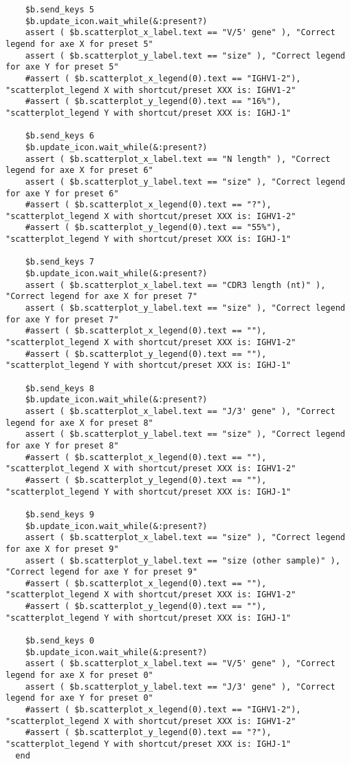 \begin{verbatim}
    $b.send_keys 5
    $b.update_icon.wait_while(&:present?)
    assert ( $b.scatterplot_x_label.text == "V/5' gene" ), "Correct legend for axe X for preset 5"
    assert ( $b.scatterplot_y_label.text == "size" ), "Correct legend for axe Y for preset 5"
    #assert ( $b.scatterplot_x_legend(0).text == "IGHV1-2"), "scatterplot_legend X with shortcut/preset XXX is: IGHV1-2"
    #assert ( $b.scatterplot_y_legend(0).text == "16%"), "scatterplot_legend Y with shortcut/preset XXX is: IGHJ-1"

    $b.send_keys 6
    $b.update_icon.wait_while(&:present?)
    assert ( $b.scatterplot_x_label.text == "N length" ), "Correct legend for axe X for preset 6"
    assert ( $b.scatterplot_y_label.text == "size" ), "Correct legend for axe Y for preset 6"
    #assert ( $b.scatterplot_x_legend(0).text == "?"), "scatterplot_legend X with shortcut/preset XXX is: IGHV1-2"
    #assert ( $b.scatterplot_y_legend(0).text == "55%"), "scatterplot_legend Y with shortcut/preset XXX is: IGHJ-1"

    $b.send_keys 7
    $b.update_icon.wait_while(&:present?)
    assert ( $b.scatterplot_x_label.text == "CDR3 length (nt)" ), "Correct legend for axe X for preset 7"
    assert ( $b.scatterplot_y_label.text == "size" ), "Correct legend for axe Y for preset 7"
    #assert ( $b.scatterplot_x_legend(0).text == ""), "scatterplot_legend X with shortcut/preset XXX is: IGHV1-2"
    #assert ( $b.scatterplot_y_legend(0).text == ""), "scatterplot_legend Y with shortcut/preset XXX is: IGHJ-1"

    $b.send_keys 8
    $b.update_icon.wait_while(&:present?)
    assert ( $b.scatterplot_x_label.text == "J/3' gene" ), "Correct legend for axe X for preset 8"
    assert ( $b.scatterplot_y_label.text == "size" ), "Correct legend for axe Y for preset 8"
    #assert ( $b.scatterplot_x_legend(0).text == ""), "scatterplot_legend X with shortcut/preset XXX is: IGHV1-2"
    #assert ( $b.scatterplot_y_legend(0).text == ""), "scatterplot_legend Y with shortcut/preset XXX is: IGHJ-1"

    $b.send_keys 9
    $b.update_icon.wait_while(&:present?)
    assert ( $b.scatterplot_x_label.text == "size" ), "Correct legend for axe X for preset 9"
    assert ( $b.scatterplot_y_label.text == "size (other sample)" ), "Correct legend for axe Y for preset 9"
    #assert ( $b.scatterplot_x_legend(0).text == ""), "scatterplot_legend X with shortcut/preset XXX is: IGHV1-2"
    #assert ( $b.scatterplot_y_legend(0).text == ""), "scatterplot_legend Y with shortcut/preset XXX is: IGHJ-1"

    $b.send_keys 0
    $b.update_icon.wait_while(&:present?)
    assert ( $b.scatterplot_x_label.text == "V/5' gene" ), "Correct legend for axe X for preset 0"
    assert ( $b.scatterplot_y_label.text == "J/3' gene" ), "Correct legend for axe Y for preset 0"
    #assert ( $b.scatterplot_x_legend(0).text == "IGHV1-2"), "scatterplot_legend X with shortcut/preset XXX is: IGHV1-2"
    #assert ( $b.scatterplot_y_legend(0).text == "?"), "scatterplot_legend Y with shortcut/preset XXX is: IGHJ-1"
  end
\end{verbatim}

